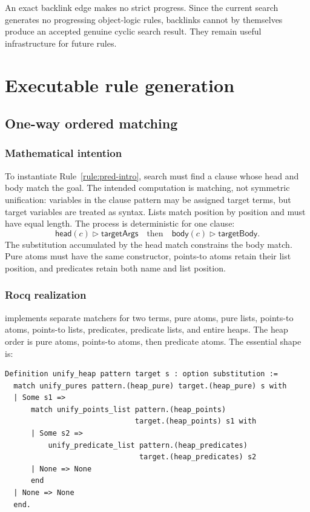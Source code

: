 \documentclass[11pt,oneside]{book}
\DeclareRobustCommand{\file}[1]{\texttt{\detokenize{#1}}}
\newcommand{\mathintent}{\subsection*{Mathematical intention}}
\newcommand{\rocqreal}{\subsection*{Rocq realization}}
\begin{document}
An exact backlink edge makes no strict progress.  Since the current search
generates no progressing object-logic rules, backlinks cannot by themselves
produce an accepted genuine cyclic search result.  They remain useful
infrastructure for future rules.

\chapter{Executable rule generation}
\label{ch:generation}

\section{One-way ordered matching}

\mathintent

To instantiate Rule~\ref{rule:pred-intro}, search must find a clause whose head
and body match the goal.  The intended computation is matching, not symmetric
unification: variables in the clause pattern may be assigned target terms, but
target variables are treated as syntax.  Lists match position by position and
must have equal length.  The process is deterministic for one clause:
\[
 \mathsf{head}(c)\mathrel{\triangleright}\mathsf{targetArgs}
 \quad\text{then}\quad
 \mathsf{body}(c)\mathrel{\triangleright}\mathsf{targetBody}.
\]
The substitution accumulated by the head match constrains the body match.
Pure atoms must have the same constructor, points-to atoms retain their list
position, and predicates retain both name and list position.

\rocqreal

\file{SP/RuleGeneration.v} implements separate matchers for two terms, pure
atoms, pure lists, points-to atoms, points-to lists, predicates, predicate lists,
and entire heaps.  The heap order is pure atoms, points-to atoms, then predicate
atoms.  The essential shape is:

\begin{lstlisting}[caption={Ordered heap matching; no permutation search occurs.}]
Definition unify_heap pattern target s : option substitution :=
  match unify_pures pattern.(heap_pure) target.(heap_pure) s with
  | Some s1 =>
      match unify_points_list pattern.(heap_points)
                              target.(heap_points) s1 with
      | Some s2 =>
          unify_predicate_list pattern.(heap_predicates)
                               target.(heap_predicates) s2
      | None => None
      end
  | None => None
  end.
\end{lstlisting}
\end{document}
